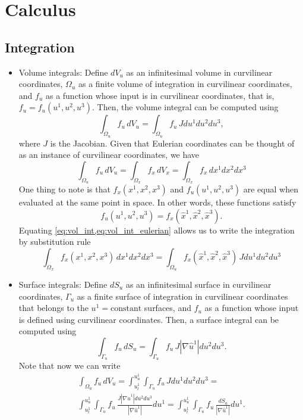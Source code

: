 \documentclass[11pt]{article}
\begin{document}
\section{Calculus}
\subsection{Integration}
\begin{itemize}

\item Volume integrals: Define $d V_u$ as an infinitesimal volume in curvilinear coordinates, $\Omega_u$ as a finite volume of integration in curvilinear coordinates, and $f_u$ as a function whose input is in curvilinear coordinates, that is, $f_u = f_u(u^1,u^2,u^3)$. Then, the volume integral can be computed using
\begin{equation}
\label{eq:vol_int}
    \int_{\Omega_u} f_u \, d V_u = \int_{\Omega_u} f_u \, J du^1 du^2 du^3,
\end{equation}
where $J$ is the Jacobian. Given that Eulerian coordinates can be thought of as an instance of curvilinear coordinates, we have
\begin{equation}
\label{eq:vol_int_eulerian}
    \int_{\Omega_u} f_u \, dV_u =  \int_{\Omega_x} f_x \, dV_x = \int_{\Omega_x} f_x \, dx^1 dx^2 dx^3 
\end{equation}
One thing to note is that $f_x(x^1,x^2,x^3)$ and $f_u(u^1,u^2,u^3)$ are equal when evaluated at the same point in space.
In other words, these functions satisfy
\begin{equation}
    f_u(u^1,u^2,u^3) = f_x(\hat{x}^1, \hat{x}^2, \hat{x}^3).
\end{equation}
Equating \cref{eq:vol_int,eq:vol_int_eulerian} allows us to write the integration by substitution rule
\begin{equation}
    \int_{\Omega_x} f_x(x^1,x^2,x^3) \, dx^1 dx^2 dx^3 = \int_{\Omega_u} f_x(\hat{x}^1, \hat{x}^2, \hat{x}^3) \, J du^1 du^2 du^3
\end{equation}

\item Surface integrals: Define $d S_u$ as an infinitesimal surface in curvilinear coordinates, $\Gamma_u$ as a finite surface of integration in curvilinear coordinates that belongs to the $u^1 = \text{constant}$ surfaces, and $f_u$ as a function whose input is defined using curvilinear coordinates. Then, a surface integral can be computed using 
\begin{equation}
    \int_{\Gamma_u} f_u\, d S_u = \int_{\Gamma_u} f_u \, J | \nabla \hat{u}^1| du^2 du^3.
\end{equation}
Note that now we can write
\begin{multline}
\label{eq:int_from_vol_surf}
    \int_{\Omega_u} f_u \,dV_u = \int_{u^1_l}^{u^1_u} \int_{\Gamma_u} f_u \, J du^1 du^2 du^3 = \\ 
    \int_{u^1_l}^{u^1_u} \int_{\Gamma_u} f_u \, \frac{J | \nabla \hat{u}^1| du^2 du^3}{| \nabla \hat{u}^1 |} du^1 = \int_{u^1_l}^{u^1_u} \int_{\Gamma_u} f_u \, \frac{dS_u}{|\nabla \hat{u}^1|} du^1.
\end{multline}

\end{itemize}
\end{document}
